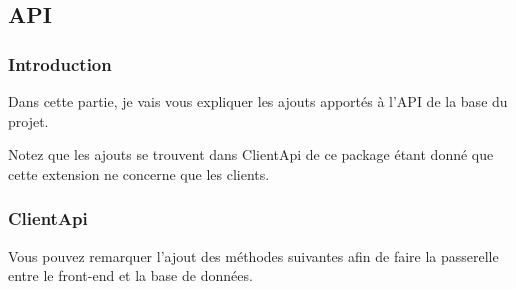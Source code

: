 \subsection{API}

\subsubsection{Introduction}

\begin{flushleft}
Dans cette partie, je vais vous expliquer les ajouts apportés à l'API de la base du projet. 
\end{flushleft}
\begin{flushleft}
Notez que les ajouts se trouvent dans ClientApi de ce package étant donné que cette extension ne concerne que les clients.
\end{flushleft}

\subsubsection{ClientApi}

\begin{flushleft}
Vous pouvez remarquer l'ajout des méthodes suivantes afin de faire la passerelle entre le front-end et la base de données.
\end{flushleft}

